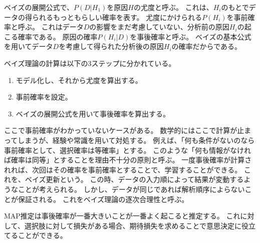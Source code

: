 \documentclass{ltjsarticle}
\begin{document}
ベイズの展開公式で、$P(D|H_1)$を原因$H$の尤度と呼ぶ。
これは、$H_i$のもとでデータの得られるもっともらしい確率を表す。
尤度にかけられる$P(H_i)$を事前確率と呼ぶ。
これはデータ$D$の影響をまだ考慮していない、分析前の原因$H_i$の起こる確率である。
原因の確率$P(H_i|D)$を事後確率と呼ぶ。
ベイズの基本公式を用いてデータ$D$を考慮して得られた分析後の原因$H_i$の確率だからである。

ベイズ理論の計算は以下の3ステップに分かれている。
\begin{enumerate}
    \item モデル化し、それから尤度を算出する。
    \item 事前確率を設定。
    \item ベイズの展開公式を用いて事後確率を算出する。
\end{enumerate}
ここで事前確率がわかっていないケースがある。
数学的にはここで計算が止まってしまうが、経験や常識を用いて対処する。
例えば、「何も条件がないのなら事前確率として、選択確率は等確率」とする。
このような「何も情報がなければ確率は同等」とすることを理由不十分の原則と呼ぶ。
一度事後確率が計算されれば、次回はその確率を事前確率とすることで、学習することができる。
これを、ベイズ更新という。
この時、データの入力順によって結果が変動するようなことが考えられる。
しかし、データが同じであれば解析順序によらないことが保証される。
これをベイズ理論の逐次合理性と呼ぶ。

MAP推定は事後確率が一番大きいことが一番よく起こると推定する。
これに対して、選択肢に対して損失がある場合、期待損失を求めることで意思決定に役立てることができる。
\end{document}
